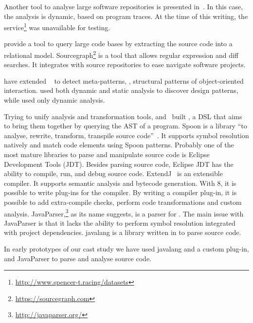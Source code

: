 Another tool to analyse large software repositories is presented in~\cite{brandauerSpencerInteractiveHeap2017}.
In this case, the analysis is dynamic, based on program traces. 
At the time of this writing, the service\footnote{\url{http://www.spencer-t.racing/datasets}} was unavailable for testing. 

\cite{bajracharyaSourcererInternetscaleSoftware2009} provide a tool to query large code bases by extracting the source code into a relational model.
Sourcegraph\footnote{\url{https://sourcegraph.com}} is a tool that allows regular expression and diff searches.
It integrates with source repositories to ease navigate software projects.

\cite{posnettTHEXMiningMetapatterns2010} have extended
\asm{}~\citep{brunetonASMCodeManipulation2002}
to detect meta-patterns, \ie{},
structural patterns of object-oriented interaction.
\cite{huDynamicAnalysisDesign2008} used both dynamic and static analysis to discover design patterns, while \cite{arcelliDesignPatternDetection2008} used only dynamic analysis.

Trying to unify analysis and transformation tools,
\cite{vinjuHowMakeBridge2006} and~\cite{klintRASCALDomainSpecific2009} built \rascal{},
a DSL that aims to bring them together by querying the AST of a program.
Spoon is a \java{} library
``to analyse, rewrite, transform, transpile \java{} source code''~\citep{pawlak:hal-01169705}.
It supports symbol resolution natively and match code elements using Spoon patterns.
Probably one of the most mature libraries to parse and manipulate \java{} source code is Eclipse \java{} Development Tools (JDT).%
Besides parsing \java{} source code,
Eclipse JDT has the ability to compile, run, and debug \java{} source code.
ExtendJ~\citep{Ekman:2007:JEJ:1297027.1297029} is an extensible \java{} compiler.
It supports semantic analysis and bytecode generation.
With \java{} 8, it is possible to write plug-ins for the \javac{} compiler.
By writing a compiler plug-in, it is possible to add extra-compile checks,
perform code transformations and custom analysis.
JavaParser,\footnote{\url{http://javaparser.org/}} as its name suggests,
is a parser for \java{}.
The main issue with JavaParser is that it lacks the ability to perform symbol resolution integrated with project dependencies.
javalang is a library written in \python{} to parse \java{} source code.

In early prototypes of our cast study we have used
javalang and a custom \javac{} plug-in,%
and JavaParser%
to parse and analyse \java{} source code.


